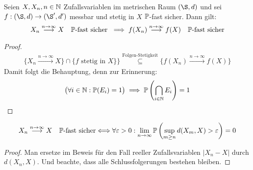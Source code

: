 \begin{satz}\label{Satz3.8} %
Seien $X,X_n,n\in\N$ Zufallsvariablen im metrischen Raum $(\S,d)$ und sei $f:(\S,d)\to(\S',d')$ messbar und stetig in $X$ $\P$-fast sicher.
Dann gilt:
\begin{align*}
X_n
\stackrel{n\to\infty}{\longrightarrow}
X\quad\P\text{-fast sicher }
\implies
f(X_n)
\stackrel{n\to\infty}{\longrightarrow}
f(X)\quad\P\text{-fast sicher}
\end{align*}
\end{satz}
\begin{proof}
\begin{align*}
\lbrace X_n
\stackrel{n\to\infty}{\longrightarrow}
X\rbrace\cap\lbrace f\text{ stetig in }X\rbrace\rbrace
\stackrel{\text{Folgen-Stetigkeit}}{\subseteq}
\lbrace f(X_n)
\stackrel{n\to\infty}{\longrightarrow}
f(X)\rbrace
\end{align*}
Damit folgt die Behauptung, denn zur Erinnerung:
\begin{align*}
\big(\forall i\in\N:\P(E_i)=1\big)\implies\P\left(\bigcap\limits_{i\in\N} E_i\right)=1
\end{align*}
\end{proof}

\begin{satz}\label{Satz3.9} %
\begin{align*}
X_n
\stackrel{n\to\infty}{\longrightarrow}
X\quad\P\text{-fast sicher}
\Longleftrightarrow
\forall\varepsilon>0:\limn\P\left(\sup\limits_{m\geq n} d(X_m,X)>\varepsilon\right)=0
\end{align*}
\end{satz}
\begin{proof}
Man ersetze im Beweis für den Fall reeller Zufallsvariablen $|X_n-X|$ durch $d(X_n,X)$. Und beachte, dass alle Schlussfolgerungen bestehen bleiben.
\end{proof}

